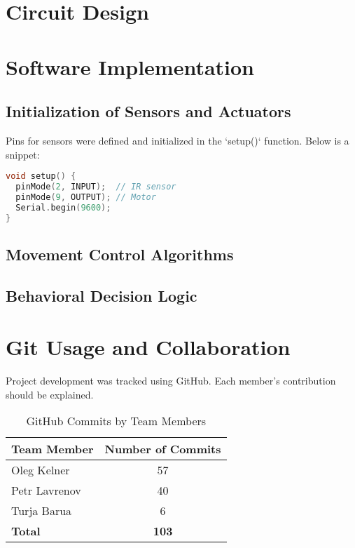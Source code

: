 \documentclass[conference]{IEEEtran}
\begin{document}
\section{Circuit Design}


\section{Software Implementation}
\label{soft}

\subsection{Initialization of Sensors and Actuators}
Pins for sensors were defined and initialized in the `setup()` function. Below is a snippet:
\begin{lstlisting}[language=C++, caption=Sensor Initialization Code]
void setup() {
  pinMode(2, INPUT);  // IR sensor
  pinMode(9, OUTPUT); // Motor
  Serial.begin(9600);
}
\end{lstlisting}

\subsection{Movement Control Algorithms}


\subsection{Behavioral Decision Logic}


\section{Git Usage and Collaboration}
Project development was tracked using GitHub. Each member's contribution should be explained.

\begin{table}[ht]
\centering
\begin{tabular}{l|c}
\hline
\textbf{Team Member} & \textbf{Number of Commits} \\
\hline
Oleg Kelner     & 57 \\
Petr Lavrenov     & 40  \\
Turja Barua     & 6  \\
\hline
\textbf{Total} & \textbf{103} \\
\hline
\end{tabular}
\caption{GitHub Commits by Team Members}
\label{table:commit}
\end{table}
\end{document}
